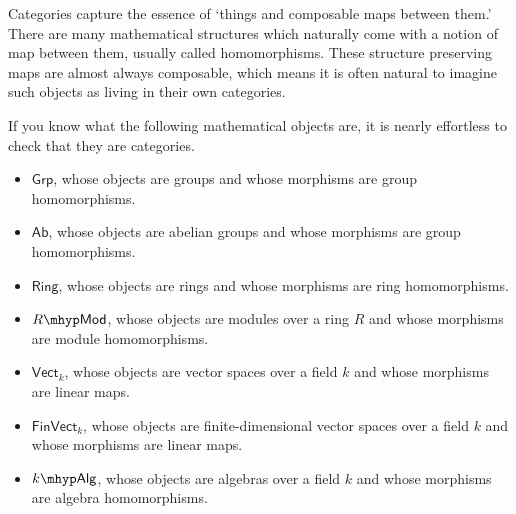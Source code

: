 \documentclass[main.tex]{subfiles}
\begin{document}
\begin{example}
\begin{itemize}

  \end{itemize}
\end{example}

Categories capture the essence of `things and composable maps between them.' There are many mathematical structures which naturally come with a notion of map between them, usually called homomorphisms. These structure preserving maps are almost always composable, which means it is often natural to imagine such objects as living in their own categories.
\begin{example}
  \label{eg:examplesofcategories}
  If you know what the following mathematical objects are, it is nearly effortless to check that they are categories.
  \begin{itemize}
    \item $\mathsf{Grp}$, whose objects are groups and whose morphisms are group homomorphisms.

    \item\label{item:categoryab} $\mathsf{Ab}$, whose objects are abelian groups and whose morphisms are group homomorphisms.

    \item $\mathsf{Ring}$, whose objects are rings and whose morphisms are ring homomorphisms.

    \item $R\mhyp\mathsf{Mod}$, whose objects are modules over a ring $R$ and whose morphisms are module homomorphisms.

    \item $\mathsf{Vect}_{k}$, whose objects are vector spaces over a field $k$ and whose morphisms are linear maps.
    \item $\mathsf{FinVect}_{k}$, whose objects are finite-dimensional vector spaces over a field $k$ and whose morphisms are linear maps.
    \item $k\mhyp\mathsf{Alg}$, whose objects are algebras over a field $k$ and whose morphisms are algebra homomorphisms.
  \end{itemize}
\end{example}
\end{document}
